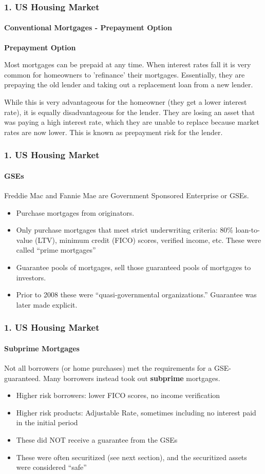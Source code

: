\documentclass{beamer}
\begin{document}
\begin{frame}[t]
    \frametitle{1. US Housing Market}
    \framesubtitle{Conventional Mortgages - Prepayment Option}

    \textbf{Prepayment Option}
    \vspace{1em}
    
    Most mortgages can be prepaid at any time. When interest rates fall it is very common for homeowners to ’refinance’ their mortgages. Essentially, they are prepaying the old lender and taking out a replacement loan from a new lender.
    \vspace{1em}
    
    While this is very advantageous for the homeowner (they get a lower interest rate), it is equally disadvantageous for the lender. They are losing an asset that was paying a high interest rate, which they are unable to replace because market rates are now lower. This is known as prepayment risk for the lender.

\end{frame}

\begin{frame}[t]
    \frametitle{1. US Housing Market}
    \framesubtitle{GSEs}

    Freddie Mac and Fannie Mae are Government Sponsored Enterprise or GSEs.   

    \begin{itemize}
        \item Purchase mortgages from originators.
        \item Only purchase mortgages that meet strict underwriting criteria: 80\% loan-to-value (LTV), minimum credit (FICO) scores, verified income, etc.   These were called “prime mortgages”
        \item Guarantee pools of mortgages, sell those guaranteed pools of mortgages to investors.
        \item Prior to 2008 these were “quasi-governmental organizations.”   Guarantee was later made explicit.
    \end{itemize}

\end{frame}

\begin{frame}[t]
    \frametitle{1. US Housing Market}
    \framesubtitle{Subprime Mortgages}

Not all borrowers (or home purchases) met the requirements for a GSE-guaranteed.   Many borrowers instead took out \textbf{subprime} mortgages.
\begin{itemize}
    \item Higher risk borrowers: lower FICO scores, no income verification
    \item Higher risk products: Adjustable Rate, sometimes including no interest paid in the initial period
    \item These did NOT receive a guarantee from the GSEs
    \item These were often securitized (see next section), and the securitized assets were considered “safe”
\end{itemize}

\end{frame}
\end{document}
